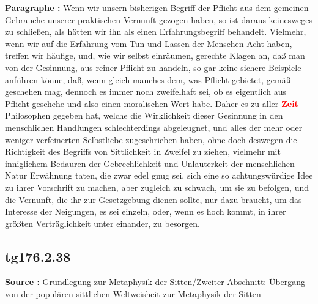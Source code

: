 \documentclass[a4paper,12pt,twoside]{book}
\newcommand{\match}[1]{\textcolor{red}{\textbf{#1}}}
\begin{document}
	\noindent\textbf{Paragraphe : }Wenn wir unsern bisherigen Begriff der Pflicht aus dem gemeinen Gebrauche unserer praktischen Vernunft gezogen haben, so ist daraus keinesweges zu schließen, als hätten wir ihn als einen Erfahrungsbegriff behandelt. Vielmehr, wenn wir auf die Erfahrung vom Tun und Lassen der Menschen Acht haben, treffen wir häufige, und, wie wir selbst einräumen, gerechte Klagen an, daß man von der Gesinnung, aus reiner Pflicht zu handeln, so gar keine sichere Beispiele anführen könne, daß, wenn gleich manches dem, was Pflicht gebietet, gemäß geschehen mag, dennoch es immer noch zweifelhaft sei, ob es eigentlich aus Pflicht geschehe und also einen moralischen Wert habe. Daher es zu aller \match{Zeit} Philosophen gegeben hat, welche die Wirklichkeit  dieser Gesinnung in den menschlichen Handlungen schlechterdings abgeleugnet, und alles der mehr oder weniger verfeinerten Selbstliebe zugeschrieben haben, ohne doch deswegen die Richtigkeit des Begriffs von Sittlichkeit in Zweifel zu ziehen, vielmehr mit inniglichem Bedauren der Gebrechlichkeit und Unlauterkeit der menschlichen Natur Erwähnung taten, die zwar edel gnug sei, sich eine so achtungswürdige Idee zu ihrer Vorschrift zu machen, aber zugleich zu schwach, um sie zu befolgen, und die Vernunft, die ihr zur Gesetzgebung dienen sollte, nur dazu braucht, um das Interesse der Neigungen, es sei einzeln, oder, wenn es hoch kommt, in ihrer größten Verträglichkeit unter einander, zu besorgen. 
	
	\subsection*{tg176.2.38} 
	\textbf{Source : }Grundlegung zur Metaphysik der Sitten/Zweiter Abschnitt: Übergang von der populären sittlichen Weltweisheit zur Metaphysik der Sitten\\  
	
\end{document}
